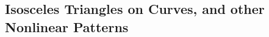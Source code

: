 \documentclass[dvipsnames,letterpaper,12pt]{article}
\numberwithin{equation}{section}
\DeclareMathOperator{\TT}{\mathbb{T}}
\newtheorem{theorem}{Theorem}
\numberwithin{theorem}{section}
\begin{document}



\subsection{Isosceles Triangles on Curves, and other Nonlinear Patterns}
\end{document}

